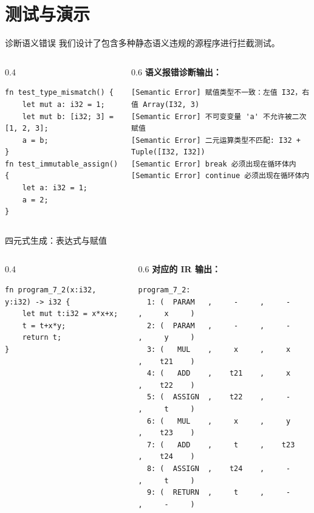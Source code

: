 \documentclass[aspectratio=169]{ctexbeamer}
\begin{document}
\section{测试与演示}

\begin{frame}[fragile]{诊断语义错误}
    我们设计了包含多种静态语义违规的源程序进行拦截测试。
    \begin{columns}[T]
    \begin{column}{0.4\textwidth}
\begin{lstlisting}[language=RustLike, basicstyle=\tiny\ttfamily]
fn test_type_mismatch() {
    let mut a: i32 = 1;
    let mut b: [i32; 3] = [1, 2, 3];
    a = b;
}
fn test_immutable_assign() {
    let a: i32 = 1;
    a = 2;
}
\end{lstlisting}
    \end{column}
    \begin{column}{0.6\textwidth}
    \textbf{语义报错诊断输出：}
\begin{lstlisting}[basicstyle=\tiny\ttfamily,numbers=none]
[Semantic Error] 赋值类型不一致：左值 I32，右值 Array(I32, 3)
[Semantic Error] 不可变变量 'a' 不允许被二次赋值
[Semantic Error] 二元运算类型不匹配: I32 + Tuple([I32, I32])
[Semantic Error] break 必须出现在循环体内
[Semantic Error] continue 必须出现在循环体内
\end{lstlisting}
    \end{column}
    \end{columns}
\end{frame}

\begin{frame}[fragile]{四元式生成：表达式与赋值}
    \begin{columns}[T]
    \begin{column}{0.4\textwidth}
\begin{lstlisting}[language=RustLike, basicstyle=\tiny\ttfamily]
fn program_7_2(x:i32, y:i32) -> i32 {
    let mut t:i32 = x*x+x;
    t = t+x*y;
    return t;
}
\end{lstlisting}
    \end{column}
    \begin{column}{0.6\textwidth}
    \textbf{对应的 IR 输出：}
\begin{lstlisting}[basicstyle=\tiny\ttfamily,numbers=none]
program_7_2:
  1: (  PARAM   ,     -     ,     -     ,     x     )
  2: (  PARAM   ,     -     ,     -     ,     y     )
  3: (   MUL    ,     x     ,     x     ,    t21    )
  4: (   ADD    ,    t21    ,     x     ,    t22    )
  5: (  ASSIGN  ,    t22    ,     -     ,     t     )
  6: (   MUL    ,     x     ,     y     ,    t23    )
  7: (   ADD    ,     t     ,    t23    ,    t24    )
  8: (  ASSIGN  ,    t24    ,     -     ,     t     )
  9: (  RETURN  ,     t     ,     -     ,     -     )
\end{lstlisting}
    \end{column}
    \end{columns}
\end{frame}
\end{document}

